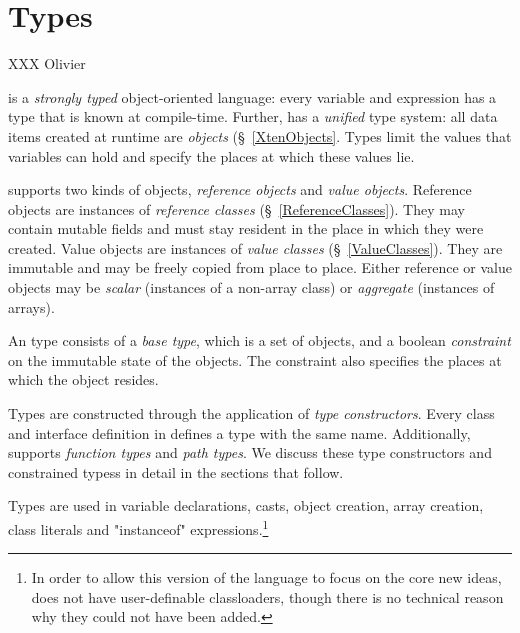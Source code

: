 \chapter{Types}
\label{XtenTypes}

XXX Olivier

{}\Xten{} is a {\em strongly typed} object-oriented language: every variable
and expression has a type that is known at compile-time. Further,
\Xten{} has a {\em unified} type system: all data items created at
runtime are {\em objects} (\S~\ref{XtenObjects}. Types limit the
values that variables can hold and specify the places at which these
values lie.

{}\Xten{} supports two kinds of objects, {\em reference objects} and
{\em value objects}.  Reference objects are instances of {\em
reference classes} (\S~\ref{ReferenceClasses}). They may contain
mutable fields and must stay resident in the place in which they were
created. Value objects are instances of {\em value classes}
(\S~\ref{ValueClasses}). They are immutable and may be freely copied
from place to place. Either reference or value objects may be 
{\em scalar} (instances of a non-array class) or {\em aggregate} (instances
of arrays).

An \Xten{} type consists of a {\em base type}, which is a set of
objects, and a boolean {\em constraint} on the immutable state of
the objects.
The constraint also
specifies the places at which the object resides.

\label{TypeConstructors}
Types are constructed through the application of {\em type constructors}.
Every class and interface definition in \Xten{} defines a type with
the same name. Additionally, {}\Xten{} supports {\em function
types}
and {\em path types}.
We discuss these type constructors and constrained typess in detail
in the sections that follow.

Types are used in variable declarations, casts, object creation, array
creation, class literals and \xcd"instanceof" expressions.\footnote{In
order to allow this version of the language to focus on the core new
ideas, \XtenCurrVer{} does not have user-definable classloaders,
though there is no technical reason why they could not have been
added.}



